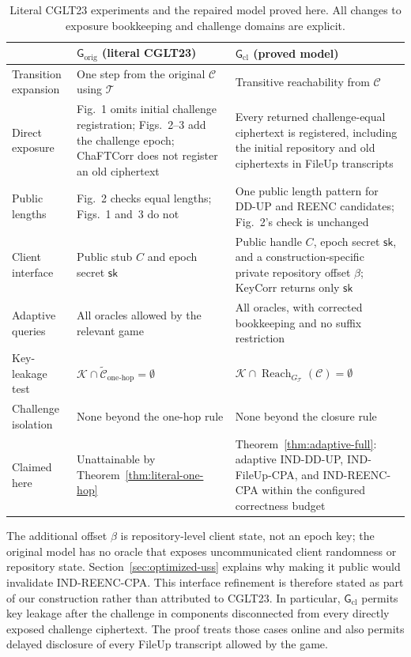 \begin{table}[htbp]
\centering
\caption{Literal CGLT23 experiments and the repaired model proved here. All changes to exposure bookkeeping and challenge domains are explicit.}
\label{tab:game-models}
\small
\begin{tabularx}{\textwidth}{@{}>{\raggedright\arraybackslash}p{}YY@{}}
\toprule
 & $\mathsf G_{\mathrm{orig}}$ (literal CGLT23) & $\mathsf G_{\mathrm{cl}}$ (proved model) \\
\midrule
Transition expansion & One step from the original $\mathcal C$ using $\mathcal T$ & Transitive reachability from $\mathcal C$ \\
Direct exposure & Fig.~1 omits initial challenge registration; Figs.~2--3 add the challenge epoch; ChaFTCorr does not register an old ciphertext & Every returned challenge-equal ciphertext is registered, including the initial repository and old ciphertexts in FileUp transcripts \\
Public lengths & Fig.~2 checks equal lengths; Figs.~1 and~3 do not & One public length pattern for DD-UP and REENC candidates; Fig.~2's check is unchanged \\
Client interface & Public stub $C$ and epoch secret $\mathsf{sk}$ & Public handle $C$, epoch secret $\mathsf{sk}$, and a construction-specific private repository offset $\beta$; KeyCorr returns only $\mathsf{sk}$ \\
Adaptive queries & All oracles allowed by the relevant game & All oracles, with corrected bookkeeping and no suffix restriction \\
Key-leakage test & $\mathcal K\cap\widetilde{\mathcal C}_{\mathrm{one\text{-}hop}}=\emptyset$ & $\mathcal K\cap\operatorname{Reach}_{G_{\mathcal T}}(\mathcal C)=\emptyset$ \\
Challenge isolation & None beyond the one-hop rule & None beyond the closure rule \\
Claimed here & Unattainable by Theorem~\ref{thm:literal-one-hop} & Theorem~\ref{thm:adaptive-full}: adaptive IND-DD-UP, IND-FileUp-CPA, and IND-REENC-CPA within the configured correctness budget \\
\bottomrule
\end{tabularx}
\end{table}

The additional offset $\beta$ is repository-level client state, not an epoch key; the original model has no oracle that exposes uncommunicated client randomness or repository state. Section~\ref{sec:optimized-uss} explains why making it public would invalidate IND-REENC-CPA. This interface refinement is therefore stated as part of our construction rather than attributed to CGLT23. In particular, $\mathsf G_{\mathrm{cl}}$ permits key leakage after the challenge in components disconnected from every directly exposed challenge ciphertext. The proof treats those cases online and also permits delayed disclosure of every FileUp transcript allowed by the game.

